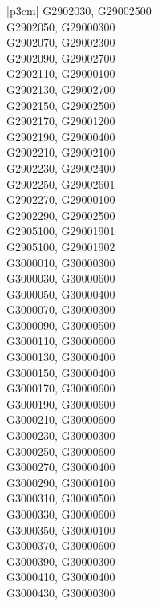 \begin{customLongTable}{ |p{3cm}| }
G2902030, G29002500 \\ \hline
G2902050, G29000300 \\ \hline
G2902070, G29002300 \\ \hline
G2902090, G29002700 \\ \hline
G2902110, G29000100 \\ \hline
G2902130, G29002700 \\ \hline
G2902150, G29002500 \\ \hline
G2902170, G29001200 \\ \hline
G2902190, G29000400 \\ \hline
G2902210, G29002100 \\ \hline
G2902230, G29002400 \\ \hline
G2902250, G29002601 \\ \hline
G2902270, G29000100 \\ \hline
G2902290, G29002500 \\ \hline
G2905100, G29001901 \\ \hline
G2905100, G29001902 \\ \hline
G3000010, G30000300 \\ \hline
G3000030, G30000600 \\ \hline
G3000050, G30000400 \\ \hline
G3000070, G30000300 \\ \hline
G3000090, G30000500 \\ \hline
G3000110, G30000600 \\ \hline
G3000130, G30000400 \\ \hline
G3000150, G30000400 \\ \hline
G3000170, G30000600 \\ \hline
G3000190, G30000600 \\ \hline
G3000210, G30000600 \\ \hline
G3000230, G30000300 \\ \hline
G3000250, G30000600 \\ \hline
G3000270, G30000400 \\ \hline
G3000290, G30000100 \\ \hline
G3000310, G30000500 \\ \hline
G3000330, G30000600 \\ \hline
G3000350, G30000100 \\ \hline
G3000370, G30000600 \\ \hline
G3000390, G30000300 \\ \hline
G3000410, G30000400 \\ \hline
G3000430, G30000300 \\ \hline

\end{customLongTable}
